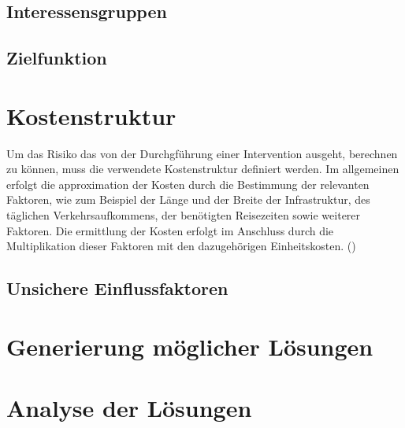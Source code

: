 	\subsection{Interessensgruppen}
	

	\pagebreak

	\subsection{Zielfunktion}
	
	
\pagebreak

\section{Kostenstruktur}
\label{sec:Kostenstruktur}

Um das Risiko das von der Durchgführung einer Intervention ausgeht, berechnen zu können, muss die verwendete Kostenstruktur definiert werden. 
Im allgemeinen erfolgt die approximation der Kosten durch die Bestimmung der relevanten Faktoren, wie zum Beispiel der Länge und der Breite der Infrastruktur, des täglichen Verkehrsaufkommens, der benötigten Reisezeiten sowie weiterer Faktoren. Die ermittlung der Kosten erfolgt im Anschluss durch die Multiplikation dieser Faktoren mit den dazugehörigen Einheitskosten. (\cite{Adey2012}) 


	
	
	\subsection{Unsichere Einflussfaktoren}
	\label{subsec:Uncertain}
	



\section{Generierung möglicher Lösungen}
\label{sec:Varianten}



\section{Analyse der Lösungen}
\label{sec:Analyse}

